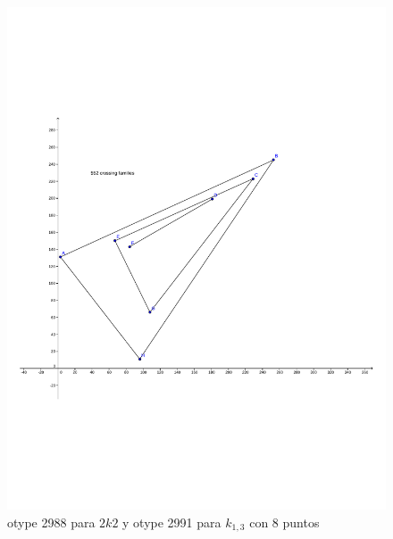 \documentclass[11pt,epsf,times,letterpaper]{article}
\begin{document}
\begin{figure}[!h]
		\includegraphics[scale=.25]{k13/min8_otype2991}
		\caption{otype 2988 para $2k2$ y otype 2991 para $k_{1,3}$ con 8 puntos}
				
	\end{figure}
\end{document}
